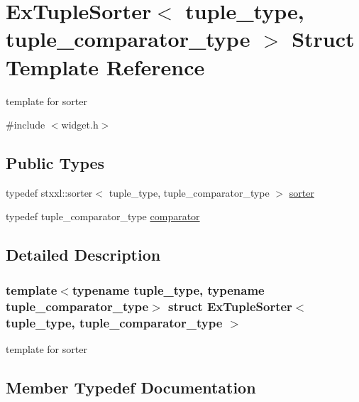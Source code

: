 \hypertarget{struct_ex_tuple_sorter}{}\section{Ex\+Tuple\+Sorter$<$ tuple\+\_\+type, tuple\+\_\+comparator\+\_\+type $>$ Struct Template Reference}
\label{struct_ex_tuple_sorter}


template for sorter  




{\ttfamily \#include $<$widget.\+h$>$}

\subsection*{Public Types}
\begin{DoxyCompactItemize}
\item 
typedef stxxl\+::sorter$<$ tuple\+\_\+type, tuple\+\_\+comparator\+\_\+type $>$ \hyperlink{struct_ex_tuple_sorter_adf836f2aaa3d62d311b66eccbf5543d5}{sorter}
\item 
typedef tuple\+\_\+comparator\+\_\+type \hyperlink{struct_ex_tuple_sorter_a876d6fabe768a68b9d730053a619298e}{comparator}
\end{DoxyCompactItemize}


\subsection{Detailed Description}
\subsubsection*{template$<$typename tuple\+\_\+type, typename tuple\+\_\+comparator\+\_\+type$>$\newline
struct Ex\+Tuple\+Sorter$<$ tuple\+\_\+type, tuple\+\_\+comparator\+\_\+type $>$}

template for sorter 

\subsection{Member Typedef Documentation}
\mbox{\label{struct_ex_tuple_sorter_a876d6fabe768a68b9d730053a619298e}} 
